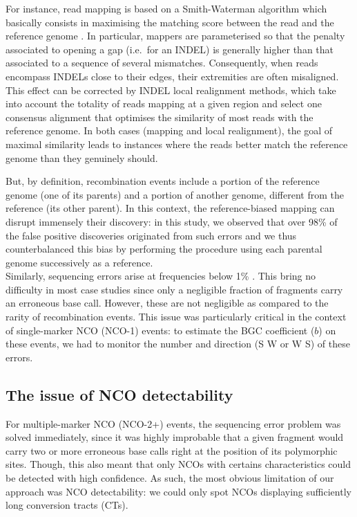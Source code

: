 For instance, read mapping is based on a Smith-Waterman algorithm which basically consists in maximising the matching score between the read and the reference genome \citep{smith1981identification}.
In particular, mappers are parameterised so that the penalty associated to opening a gap (i.e.\ for an INDEL) is generally higher than that associated to a sequence of several mismatches.
Consequently, when reads encompass INDELs close to their edges, their extremities are often misaligned.
This effect can be corrected by INDEL local realignment methods, which take into account the totality of reads mapping at a given region and select one consensus alignment that optimises the similarity of most reads with the reference genome.
In both cases (mapping and local realignment), the goal of maximal similarity leads to instances where the reads better match the reference genome than they genuinely should.

But, by definition, recombination events include a portion of the reference genome (one of its parents) and a portion of another genome, different from the reference (its other parent).
In this context, the reference-biased mapping can disrupt immensely their discovery: in this study, we observed that over 98\% of the false positive discoveries originated from such errors and we thus counterbalanced this bias by performing the procedure using each parental genome successively as a reference.\\

Similarly, sequencing errors arise at frequencies below 1\% \citep{fox2014accuracy,pfeiffer2018systematic}.
This bring no difficulty in most case studies since only a negligible fraction of fragments carry an erroneous base call.
However, these are not negligible as compared to the rarity of recombination events.
This issue was particularly critical in the context of single-marker NCO (NCO-1) events:
to estimate the BGC coefficient ($b$) on these events, we had to monitor the number and direction (S\textrightarrow{} W or W\textrightarrow{} S) of these errors.




\subsection{The issue of NCO detectability}

For multiple-marker NCO (NCO-2+) events, the sequencing error problem was solved immediately, since it was highly improbable that a given fragment would carry two or more erroneous base calls right at the position of its polymorphic sites.
Though, this also meant that only NCOs with certains characteristics could be detected with high confidence.
As such, the most obvious limitation of our approach was NCO detectability: we could only spot NCOs displaying sufficiently long conversion tracts (CTs).

